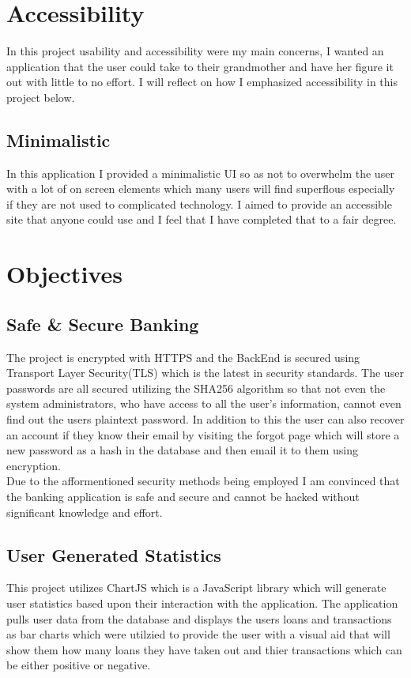 \section{Accessibility}
In this project usability and accessibility were my main concerns, I wanted an application that the user could take to their grandmother and have her figure it out with little to no effort.  I will reflect on how I emphasized accessibility in this project below.
\subsection{Minimalistic}
In this application I provided a minimalistic UI so as not to overwhelm the user
with a lot of on screen elements which many users will find superflous especially
if they are not used to complicated technology.  I aimed to provide an accessible
site that anyone could use and I feel that I have completed that to a fair degree.
\section{Objectives}
\subsection{Safe \& Secure Banking}
The project is encrypted with HTTPS and the BackEnd is secured using Transport
Layer Security(TLS) which is the latest in security standards.  The user passwords
are all secured utilizing the SHA256 algorithm so that not even the system administrators,
who have access to all the user's information, cannot even find out the users plaintext
password.  In addition to this the user can also recover an account if they know their email
by visiting the forgot page which will store a new password as a hash in the database and
then email it to them using encryption.
\\
Due to the afformentioned security methods being employed I am convinced that the
banking application is safe and secure and cannot be hacked without significant knowledge
and effort.
\subsection{User Generated Statistics}
This project utilizes ChartJS which is a JavaScript library which will generate
user statistics based upon their interaction with the application.  The application
pulls user data from the database and displays the users loans and transactions as
bar charts which were utilzied to provide the user with a visual aid that will show
them how many loans they have taken out and thier transactions which can be either
positive or negative.
